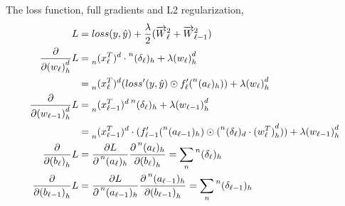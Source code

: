 \documentclass[12pt,a4paper]{article}%
\theoremstyle{definition}
\theoremstyle{plain}
\numberwithin{equation}{section}
\begin{document}
The loss function, full gradients and L2 regularization, 
\begin{align*}
 L &= loss({y}, {\hat{y}}) + \frac{\lambda}{2} ( \overrightarrow{W}_\ell^2 + \overrightarrow{W}_{\ell-1}^2 ) \\
\frac{\partial}{\partial {(w_{\ell})}^{d}_{h}} L &= \prescript{}{n}{(x_{\ell}^{T})}^{d} \cdot \prescript{n}{}{(\delta_{\ell})}_{h} + \lambda {(w_{\ell})}^{d}_{h} \\
																				  &= \prescript{}{n}{(x_{\ell}^{T})}^{d} (loss'(y,\hat{y}) \odot f'_{\ell}(\prescript{n}{}{(a_{\ell})}_{h})) + \lambda {(w_{\ell})}^{d}_{h} \\
\frac{\partial}{\partial {(w_{\ell-1})}^{d}_{h}} L &= \prescript{}{n}{(x_{\ell-1}^{T})}^{d} \prescript{n}{}{(\delta_{\ell})}_{h} + \lambda {(w_{\ell-1})}^{d}_{h} \\
																					 &= \prescript{}{n}{(x_{\ell-1}^{T})}^{d} \cdot  (f'_{\ell-1}(\prescript{n}{}{(a_{\ell-1})}_{h}) \odot (\prescript{n}{}{(\delta_{\ell})}_{d} \cdot {(w_{\ell}^{T})}^{d}_{h})) + \lambda {(w_{\ell-1})}^{d}_{h} \\
\frac{\partial}{\partial {(b_{\ell})}_{h}} L  &= \frac{\partial L}{\partial \prescript{n}{}{(a_{\ell})}_{h}} \frac{\partial \prescript{n}{}{(a_{\ell})}_{h}}{\partial {(b_{\ell})}_{h}} = \sum\limits_{n} \prescript{n}{}{(\delta_{\ell})}_{h} \\
\frac{\partial}{\partial {(b_{\ell-1})}_{h}} L  &= \frac{\partial L}{\partial \prescript{n}{}{(a_{\ell-1})}_{h}} \frac{\partial \prescript{n}{}{(a_{\ell-1})}_{h}}{\partial {(b_{\ell-1})}_{h}} = \sum\limits_{n} \prescript{n}{}{(\delta_{\ell-1})}_{h}
\end{align*} 

%
%
\end{document}
